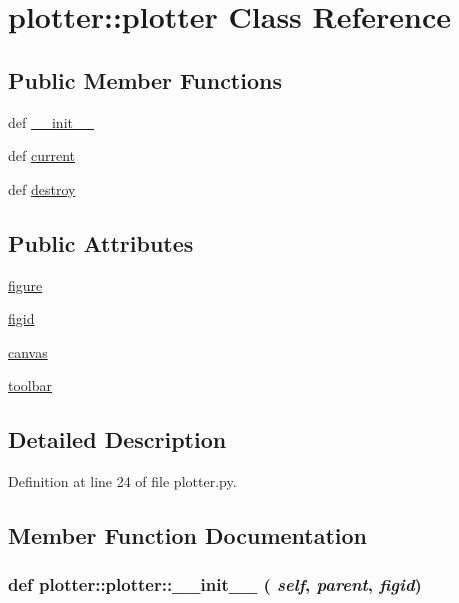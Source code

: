 \hypertarget{classplotter_1_1plotter}{
\section{plotter::plotter Class Reference}
\label{classplotter_1_1plotter}
}
\subsection*{Public Member Functions}
\begin{DoxyCompactItemize}
\item 
def \hyperlink{classplotter_1_1plotter_ab319fa99fbf16ed41498db85d050e97d}{\_\-\_\-init\_\-\_\-}
\item 
def \hyperlink{classplotter_1_1plotter_a83bdf60482eec6abedcfd01099fe5f29}{current}
\item 
def \hyperlink{classplotter_1_1plotter_a13d7be0a97584e46c5e8f27e70644948}{destroy}
\end{DoxyCompactItemize}
\subsection*{Public Attributes}
\begin{DoxyCompactItemize}
\item 
\hyperlink{classplotter_1_1plotter_a3ecf2dd31540fd3973dd783f55fa4d8b}{figure}
\item 
\hyperlink{classplotter_1_1plotter_add440b02c1e73a0636b4caa318da5b1c}{figid}
\item 
\hyperlink{classplotter_1_1plotter_afd401096ff08062bea2ee921a8e58260}{canvas}
\item 
\hyperlink{classplotter_1_1plotter_a29e30bc0a8a999b5fbd9edd951f7e52d}{toolbar}
\end{DoxyCompactItemize}


\subsection{Detailed Description}


Definition at line 24 of file plotter.py.

\subsection{Member Function Documentation}
\hypertarget{classplotter_1_1plotter_ab319fa99fbf16ed41498db85d050e97d}{
\subsubsection[{\_\-\_\-init\_\-\_\-}]{\setlength{\rightskip}{0pt plus 5cm}def plotter::plotter::\_\-\_\-init\_\-\_\- ( {\em self}, \/   {\em parent}, \/   {\em figid})}}
\label{classplotter_1_1plotter_ab319fa99fbf16ed41498db85d050e97d}


